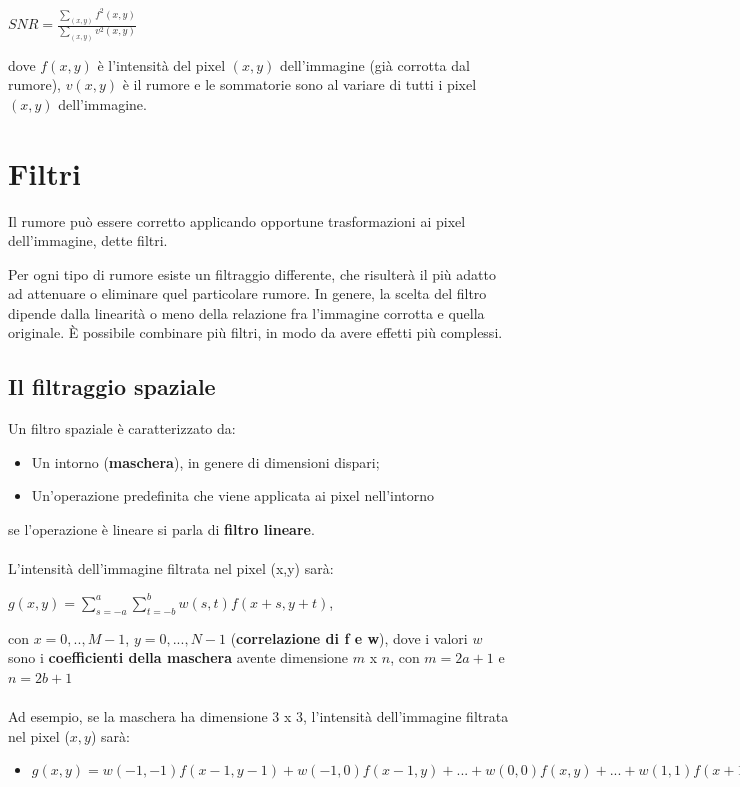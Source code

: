 \begin{center}
    $
        SNR = \frac{\sum_{(x,y)}^{}f^2(x,y)}{\sum_{(x,y)}^{}v^2(x,y)}
    $
\end{center}

dove $f(x, y)$ è l'intensità del pixel $(x, y)$ dell'immagine (già corrotta dal
rumore), $v(x, y)$ è il rumore e le sommatorie sono al variare di tutti i pixel
$(x, y)$ dell'immagine.

\section{Filtri}

\begin{definition}
    Il rumore può essere corretto applicando opportune trasformazioni ai pixel
    dell'immagine, dette filtri.
\end{definition}
Per ogni tipo di rumore esiste un filtraggio differente, che risulterà il più
adatto ad attenuare o eliminare quel particolare rumore. In genere, la scelta
del filtro dipende dalla linearità o meno della relazione fra l'immagine
corrotta e quella originale. È possibile combinare più filtri, in modo da avere
effetti più complessi.

\subsection{Il filtraggio spaziale}

Un filtro spaziale è caratterizzato da:

\begin{itemize}
    \item Un intorno (\textbf{maschera}), in genere di dimensioni dispari;
    \item Un'operazione predefinita che viene applicata ai pixel nell'intorno
\end{itemize}
se l'operazione è lineare si parla di \textbf{filtro lineare}. \\\\
L'intensità dell'immagine filtrata nel pixel (x,y) sarà:

\begin{center}
    $g(x,y) = \sum_{s=-a}^{a}\sum_{t=-b}^{b}w(s,t)f(x+s,y+t)$,
\end{center}

con $x=0,..,M-1$, $y=0,...,N-1$ (\textbf{correlazione di f e w}), dove i valori
$w$ sono i \textbf{coefficienti della maschera} avente dimensione $m$ x $n$, con
$m = 2a+1$ e $n = 2b+1$ \\\\
Ad esempio, se la maschera ha dimensione 3 x 3, l'intensità dell'immagine
filtrata nel pixel ($x,y$) sarà:
\begin{itemize}
    \item
          $g(x,y)=w(-1,-1)f(x-1,y-1)+w(-1,0)f(x-1,y)+...+w(0,0)f(x,y)+...+w(1,1)f(x+1,y+1)$
\end{itemize}

